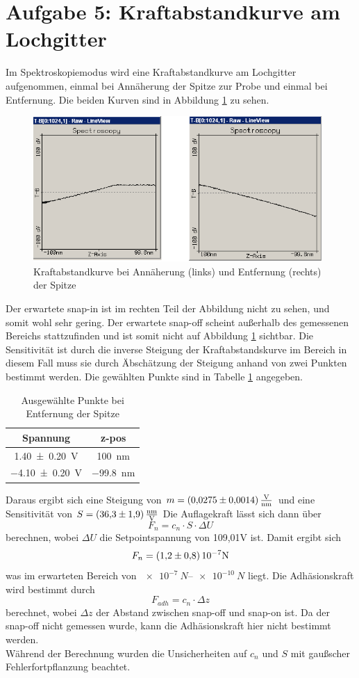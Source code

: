 \section{Aufgabe 5: Kraftabstandkurve am Lochgitter}
Im Spektroskopiemodus wird eine Kraftabstandkurve am Lochgitter aufgenommen, einmal bei Annäherung der Spitze zur Probe und einmal bei Entfernung. Die beiden Kurven sind in Abbildung \ref{fig:kraftabstand} zu sehen.
\begin{figure}[]
    \centering
    \includegraphics[width=110mm,scale=0.5]{Rasterkraftmikroskop/include/A5_komb.png}
    \caption{Kraftabstandkurve bei Annäherung (links) und Entfernung (rechts) der Spitze} 
    \label{fig:kraftabstand}
\end{figure}
Der erwartete snap-in ist im rechten Teil der Abbildung nicht zu sehen, und somit wohl sehr gering. Der erwartete snap-off scheint außerhalb des gemessenen Bereichs stattzufinden und ist somit nicht auf Abbildung \ref{fig:kraftabstand} sichtbar. 
Die Sensitivität ist durch die inverse Steigung der Kraftabstandskurve im Bereich  in diesem Fall muss sie durch Äbschätzung der Steigung anhand von zwei Punkten bestimmt werden. Die gewählten Punkte sind in Tabelle \ref{tab:koords} angegeben. 
\begin{table}[]
    \centering
    \caption{Ausgewählte Punkte bei Entfernung der Spitze}
    \begin{tabular}{c|c}
        Spannung &  z-pos\\\hline
        \SI{1.40 \pm 0.20}{V}& \SI{100}{nm}\\ 
        \SI{-4.10 \pm 0.20}{V} & \SI{-99,8}{nm} \\\hline
    \end{tabular}
    
    \label{tab:koords}
\end{table}
Daraus ergibt sich eine Steigung von $m = \SI{0.0275\pm 0,0014}{\frac{V}{nm}}$ und eine Sensitivität von $ S =\SI{36.3\pm 1.9}{\frac{nm}{V}}$
Die Auflagekraft lässt sich dann über $$F_n = c_n \cdot S\cdot \Delta U$$
berechnen, wobei $\Delta U$ die Setpointspannung von 109,01V ist. 
Damit ergibt sich $$F_n = \SI{1,2\pm0,8}{10^{-7} N}$$ was im erwarteten Bereich von $\SIrange{e-7}{e-10}{N}$ liegt.
Die Adhäsionskraft wird bestimmt durch 
$$F_{adh} = c_n \cdot \Delta z$$
berechnet, wobei $\Delta z$ der Abstand zwischen snap-off und snap-on ist. Da der snap-off nicht gemessen wurde, kann die Adhäsionskraft hier nicht bestimmt werden.\\Während der Berechnung wurden die Unsicherheiten auf $c_n$ und $S$ mit gaußscher Fehlerfortpflanzung beachtet.

